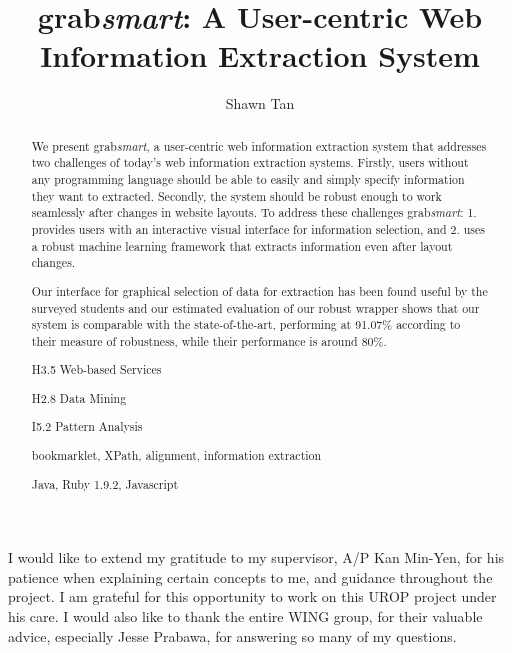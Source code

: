 \documentclass[urop]{socreport}
\begin{document}
\title{grab\textit{smart}: A User-centric Web Information Extraction System}
\author{Shawn Tan}
\maketitle
\begin{abstract}
We present grab\textit{smart}, a user-centric web information extraction system that
addresses two challenges of today's web information extraction systems. Firstly, users
without any programming language should be able to easily and simply specify information
they want to extracted. Secondly, the system should be robust enough to work seamlessly
after changes in website layouts. To address these challenges grab\textit{smart}: 1.
provides users with an interactive visual interface for information selection, and 2.
uses a robust machine learning framework that extracts information even after layout changes.

Our interface for graphical selection of data for extraction has been found useful by the surveyed students and
our estimated evaluation of our robust wrapper shows that our system is comparable with the state-of-the-art,
performing at 91.07\% according to their measure of robustness, while their performance
is around 80\%.

\begin{descriptors}
	\item H3.5 Web-based Services
    \item H2.8 Data Mining
	\item I5.2 Pattern Analysis
\end{descriptors}
\begin{keywords}
	bookmarklet,  XPath, alignment, information extraction
\end{keywords}
\begin{implement}
	Java, Ruby 1.9.2, Javascript
\end{implement}
\end{abstract}

\begin{acknowledgement}
	I would like to extend my gratitude to my supervisor, A/P Kan Min-Yen, for his patience
when explaining certain concepts to me, and guidance throughout the project. I am grateful
for this opportunity to work on this UROP project under his care. I would also like to thank
the entire WING group, for their valuable advice, especially Jesse Prabawa, for answering 
so many of my questions. 
\end{acknowledgement}
\end{document}
